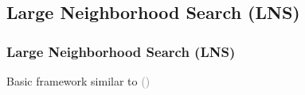\documentclass[aspectratio=1610]{beamer}
\begin{document}
\subsection{Large Neighborhood Search (LNS)}


\begin{frame}
  \frametitle{Large Neighborhood Search (LNS)}

  Basic framework similar to {\textcolor{gray}{(\cite{Ropke:2006})}}

\begin{minipage}[t]{0.3\linewidth}
\begin{figure}
	\centering

\end{figure}
\end{minipage}
\end{frame}
\end{document}

